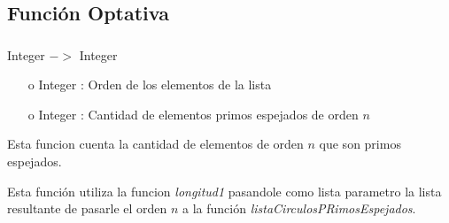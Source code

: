 \documentclass[10pt,journal]{IEEEtran}
\begin{document}
\subsection{Función Optativa}
\subsubsection{\color{Red}{contarCirculosPrimos}}
\begin{description}[style=nextline]
        \item[\color{Green}{Signatura}] Integer $->$ Integer   
        \begin{itemize}
        \item [o]  Integer : Orden de los elementos de la lista
        \item [o]  Integer : Cantidad de elementos primos espejados de orden $n$
        \end{itemize}        
        
        \item[\color{Green}{Descripción}]  Esta funcion cuenta la cantidad de elementos de orden $n$ que son primos espejados.
        
        Esta función utiliza la funcion \textit{longitud1} pasandole como lista parametro  la lista resultante de pasarle el orden $n$ a la función \textit{listaCirculosPRimosEspejados}.
\end{description}
\end{document}
